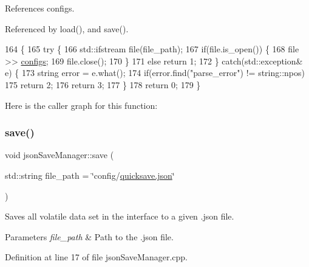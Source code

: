 References configs.



Referenced by load(), and save().


\begin{DoxyCode}
164                                                             \{
165     \textcolor{keywordflow}{try} \{
166         std::ifstream file(file\_path);
167         \textcolor{keywordflow}{if}(file.is\_open()) \{
168             file >> \hyperlink{classjson_save_manager_acfbca58deba9ed712131c20a8f965dfd}{configs};
169             file.close();
170         \}
171         \textcolor{keywordflow}{else} \textcolor{keywordflow}{return} 1;
172     \} \textcolor{keywordflow}{catch}(std::exception& e) \{
173         \textcolor{keywordtype}{string} error = e.what();
174         \textcolor{keywordflow}{if}(error.find(\textcolor{stringliteral}{"parse\_error"}) != string::npos)
175             \textcolor{keywordflow}{return} 2;
176         \textcolor{keywordflow}{return} 3;
177     \}
178     \textcolor{keywordflow}{return} 0;
179 \}
\end{DoxyCode}
Here is the caller graph for this function\+:
\mbox{\label{classjson_save_manager_a3e628f770c39e0111b46dac21d966171}} 
\subsubsection{\texorpdfstring{save()}{save()}}
{\footnotesize\ttfamily void json\+Save\+Manager\+::save (\begin{DoxyParamCaption}\item[{std\+::string}]{file\+\_\+path = {\ttfamily \char`\"{}config/\hyperlink{json_save_manager_8h_ab701e3ac61a85b337ec5c1abaad6742d}{quicksave.\+json}\char`\"{}} }\end{DoxyParamCaption})}



Saves all volatile data set in the interface to a given .json file. 


\begin{DoxyParams}{Parameters}
{\em file\+\_\+path} & Path to the .json file. \\
\hline
\end{DoxyParams}


Definition at line 17 of file json\+Save\+Manager.\+cpp.



